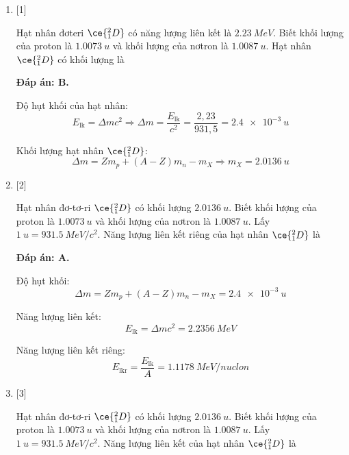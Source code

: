 \begin{enumerate}[label=\bfseries Câu \arabic*:]
{	}
	
	\item {} [1]
	\cauhoi
	{Hạt nhân đơteri $\ce{^2_1 D}$ có năng lượng liên kết là $\SI{2.23}{MeV}$. Biết khối lượng của proton là $\SI{1.0073}{u}$ và khối lượng của nơtron là $\SI{1.0087}{u}$. Hạt nhân $\ce{^2_1 D}$ có khối lượng là
	}
	
	\loigiai
	{		\textbf{Đáp án: B.}
		
		Độ hụt khối của hạt nhân:
		$$E_\text{lk} = \Delta m c^2 \Rightarrow \Delta m = \dfrac{E_\text{lk}}{c^2} = \dfrac{2,23}{931,5} = \SI{2.4e-3}{u}$$
		
		Khối lượng hạt nhân $\ce{^2_1 D}$:
		$$\Delta m = Zm_p + (A-Z)m_n - m_X \Rightarrow m_X = \SI{2.0136}{u}$$
	}
	
	
	
	\item {} [2]
	\cauhoi
	{Hạt nhân đơ-tơ-ri $\ce{^2_1 D}$ có khối lượng $\SI{2.0136}{u}$. Biết khối lượng của proton là $\SI{1.0073}{u}$ và khối lượng của nơtron là $\SI{1.0087}{u}$. Lấy $\SI{1}{u}=\SI{931.5}{MeV/c^2}$. Năng lượng liên kết riêng của hạt nhân $\ce{^2_1 D}$ là
	}
	
	\loigiai
	{		\textbf{Đáp án: A.}
		
		Độ hụt khối:
		$$\Delta m = Zm_p + (A-Z)m_n - m_X = \SI{2.4e-3}{u}$$
		
		Năng lượng liên kết:
		$$E_\text{lk} = \Delta m c^2 = \SI{2.2356}{MeV}$$
		
		Năng lượng liên kết riêng:
		$$E_\text{lkr} = \dfrac{E_\text{lk}}{A} =\SI{1.1178}{MeV/nuclon} $$
		
	}
	
	\item {} [3]
	\cauhoi
	{Hạt nhân đơ-tơ-ri $\ce{^2_1 D}$ có khối lượng $\SI{2.0136}{u}$. Biết khối lượng của proton là $\SI{1.0073}{u}$ và khối lượng của nơtron là $\SI{1.0087}{u}$. Lấy $\SI{1}{u}=\SI{931.5}{MeV/c^2}$. Năng lượng liên kết của hạt nhân $\ce{^2_1 D}$ là
	}
	

\end{enumerate}
